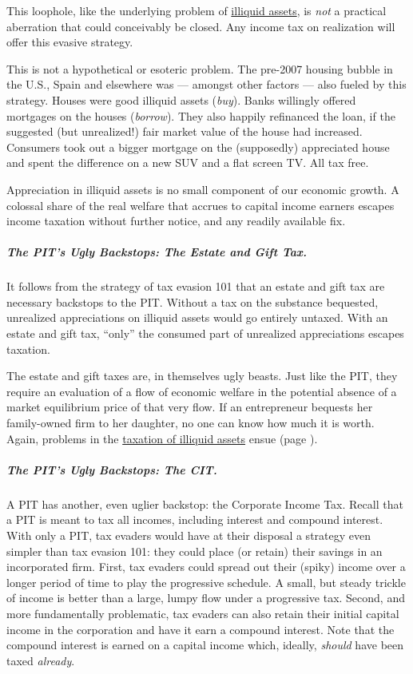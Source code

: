 This loophole, like the underlying problem of \hyperref[sec:TaxIlliquid]{illiquid assets}, is \emph{not} a practical aberration that could conceivably be closed. Any income tax on realization will offer this evasive strategy.

This is not a hypothetical or esoteric problem. The pre-2007 housing bubble in the U.S., Spain and elsewhere was --- amongst other factors --- also fueled by this strategy. Houses were good illiquid assets (\emph{buy}). Banks willingly offered mortgages on the houses (\emph{borrow}). They also happily refinanced the loan, if the suggested (but unrealized!) fair market value of the house had increased. Consumers took out a bigger mortgage on the (supposedly) appreciated house and spent the difference on a new SUV and a flat screen TV. All tax free.

Appreciation in illiquid assets is no small component of our economic growth. A colossal share of the real welfare that accrues to capital income earners escapes income taxation without further notice, and any readily available fix.

\subparagraph{The PIT's Ugly Backstops: The Estate and Gift Tax.} It follows from the strategy of tax evasion 101 that an estate and gift tax are necessary backstops to the PIT. Without a tax on the substance bequested, unrealized appreciations on illiquid assets would go entirely untaxed. With an estate and gift tax, ``only'' the consumed part of unrealized appreciations escapes taxation.

The estate and gift taxes are, in themselves ugly beasts. Just like the PIT, they require an evaluation of a flow of economic welfare in the potential absence of a market equilibrium price of that very flow. If an entrepreneur bequests her family-owned firm to her daughter, no one can know how much it is worth. Again, problems in the \hyperref[sec:Illiquid]{taxation of illiquid assets} ensue (page \pageref{sec:Illiquid}).

\subparagraph{The PIT's Ugly Backstops: The CIT.}  \label{sec:ScoreCIT} A PIT has another, even uglier backstop: the Corporate Income Tax. Recall that a PIT is meant to tax all incomes, including interest and compound interest. With only a PIT, tax evaders would have at their disposal a strategy even simpler than tax evasion 101: they could place (or retain) their savings in an incorporated firm. First, tax evaders could spread out their (spiky) income over a longer period of time to play the progressive schedule. A small, but steady trickle of income is better than a large, lumpy flow under a progressive tax. Second, and more fundamentally problematic, tax evaders can also retain their initial capital income in the corporation and have it earn a compound interest. Note that the compound interest is earned on a capital income which, ideally, \emph{should} have been taxed \emph{already}.

